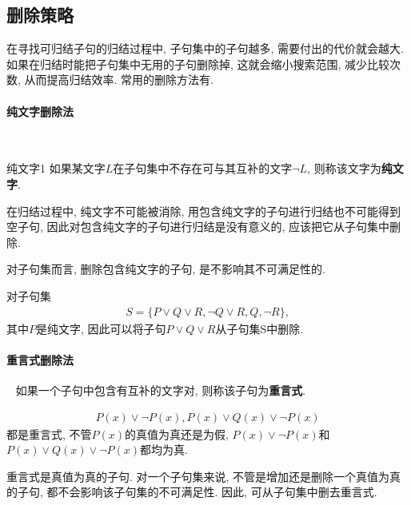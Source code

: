 \subsection{删除策略}
在寻找可归结子句的归结过程中, 子句集中的子句越多, 需要付出的代价就会越大. 如果在归结时能把子句集中无用的子句删除掉, 这就会缩小搜索范围, 减少比较次数, 从而提高归结效率.
常用的删除方法有.
\paragraph{纯文字删除法}~{}
\begin{mydef}{纯文字}{1}
    如果某文字$L$在子句集中不存在可与其互补的文字$\neg L$, 则称该文字为\textbf{纯文字}.
\end{mydef}

\begin{remark}
    在归结过程中, 纯文字不可能被消除, 用包含纯文字的子句进行归结也不可能得到空子句, 因此对包含纯文字的子句进行归结是没有意义的, 应该把它从子句集中删除.
\end{remark}
\begin{remark}
    对子句集而言, 删除包含纯文字的子句, 是不影响其不可满足性的.
\end{remark}

\begin{example}
对子句集
\begin{align}
    S=\{P\vee Q\vee R, \neg Q\vee R,  Q, \neg R\},
\end{align}
其中$P$是纯文字, 因此可以将子句$P\vee Q\vee R$从子句集S中删除.
\end{example}
\paragraph{重言式删除法}~{}
    如果一个子句中包含有互补的文字对, 则称该子句为\textbf{重言式}.
\begin{example}
\begin{align}
    P(x)\vee \neg P(x),  P(x)\vee Q(x)\vee \neg P(x)
\end{align}
都是重言式, 不管$P(x)$的真值为真还是为假, $P(x)\vee \neg P(x)$和$P(x)\vee Q(x)\vee \neg P(x)$都均为真.
\end{example}

重言式是真值为真的子句. 对一个子句集来说, 不管是增加还是删除一个真值为真的子句, 都不会影响该子句集的不可满足性. 因此, 可从子句集中删去重言式.
